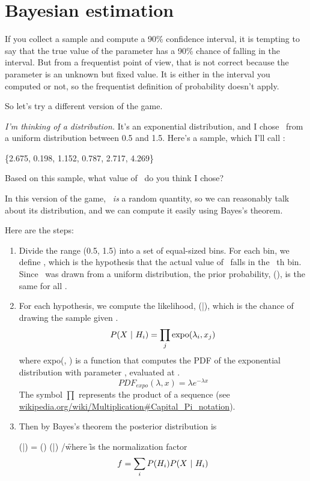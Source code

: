 \documentclass[12pt]{book}
\begin{document}


\section{Bayesian estimation}

If you collect a sample and compute a 90\% confidence interval, it is
tempting to say that the true value of the parameter has a 90\% chance
of falling in the interval.  But from a frequentist point of view,
that is not correct because the parameter is an unknown but fixed
value.  It is either in the interval you computed or not, so the
frequentist definition of probability doesn't apply.

So let's try a different version of the game.


{\em I'm thinking of a distribution.}  It's an exponential
distribution, and I chose \mylambda~from a uniform distribution
between 0.5 and 1.5.  Here's a sample, which I'll call \X:

\{2.675, 0.198, 1.152, 0.787, 2.717, 4.269\}

Based on this sample, what value of \mylambda~do you think I chose?

In this version of the game, \mylambda~{\em is} a random quantity, so we
can reasonably talk about its distribution, and we can compute it
easily using Bayes's theorem.

Here are the steps:

\begin{enumerate}

\item Divide the range (0.5, 1.5) into a set of equal-sized bins.
For each bin, we define \HH{}, which is the hypothesis that the
actual value of \mylambda~falls in the \ii~th bin.
Since \mylambda~was drawn from a uniform distribution, the prior
probability, \Prob(\HH{}), is the same for all \ii.

\item For each hypothesis, we compute the likelihood, \Prob(\X|\HH{}),
which is the chance of drawing the sample \X given \HH{}.
%
\[ P(X ~|~ H_i) = \prod_j \mathrm{expo}(\lambda_i, x_j)  \]
%
where expo(\mylambda, \x) is a function that
computes the PDF of the exponential distribution with parameter \mylambda,
evaluated at \x.  
%
\[ PDF_{expo}(\lambda, x) = \lambda e^{-\lambda x}\]
%
The symbol $\prod$ represents the product of a sequence (see
\url{wikipedia.org/wiki/Multiplication#Capital_Pi_notation}).

\item Then by Bayes's theorem the posterior distribution is

\quad \Prob(\HH{}|\X) =  \Prob(\HH{}) \Prob(\X|\HH{}) /\f

where \f is the normalization factor
%
\[ f = \sum_i P(H_i) P(X ~|~ H_i) \]
%
\end{enumerate}
\end{document}

